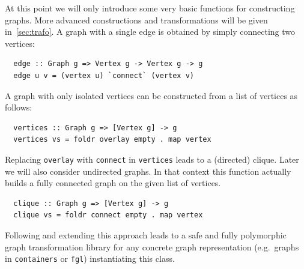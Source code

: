 \documentclass{article}
\newcommand{\hs}{\texttt}
\begin{document}
At this point we will only introduce some very basic functions for constructing
graphs. More advanced constructions and transformations will be given
in~\autoref{sec:trafo}. A graph with a single edge is obtained by simply
connecting two vertices:
\begin{verbatim}
  edge :: Graph g => Vertex g -> Vertex g -> g
  edge u v = (vertex u) `connect` (vertex v)
\end{verbatim}
A graph with only isolated vertices can be constructed from a list of vertices
as follows:
\begin{verbatim}
  vertices :: Graph g => [Vertex g] -> g
  vertices vs = foldr overlay empty . map vertex
\end{verbatim}
Replacing \hs{overlay} with \hs{connect} in \hs{vertices} leads to a (directed)
clique. Later we will also consider undirected graphs. In that context this
function actually builds a fully connected graph on the given list of vertices.
\begin{verbatim}
  clique :: Graph g => [Vertex g] -> g
  clique vs = foldr connect empty . map vertex
\end{verbatim}
Following and extending this approach leads to a safe and fully polymorphic
graph transformation library for any concrete graph representation (e.g.\ graphs
in \texttt{containers} or \texttt{fgl}) instantiating this class.
\end{document}
